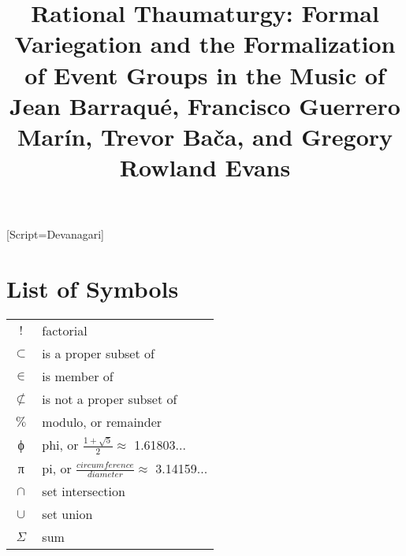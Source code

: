 \documentclass[
    School=Harvard,
    twoside,
    openright,
    BCOR10mm,
]{Dissertate}%
\begin{document}
\newfontfamily{}[Script=Devanagari]

\maketitle
\copyrightpage
\justifying
\dedicationpage
\frontispiece
\acknowledgments
\title{Rational Thaumaturgy: Formal Variegation and the Formalization of Event Groups in the Music of Jean Barraqué, Francisco Guerrero Marín, Trevor Bača, and Gregory Rowland Evans} %
\scholarlyabstractpage
\publicabstractpage
\tableofcontents
\cleardoublepage
{}
{}
\listoftables
\cleardoublepage
{}
{}
\listoffigures
\cleardoublepage
{}
{}
\lstlistoflistings
{}
\chapter*{List of Symbols}
\begin{tabular}{cp{}}
    $!$ & factorial \\
    $\subset$ & is a proper subset of \\
    $\in$ & is member of \\
    $\not\subset$ & is not a proper subset of \\
    $\%$ & modulo, or remainder \\
    ϕ & phi, or $\frac{1 + \sqrt{5}}{2}\approx$ 1.61803...\\
    π & pi, or $\frac{circumference}{diameter}\approx$ 3.14159... \\
    $\cap$ & set intersection \\
    $\cup$ & set union \\
    $\Sigma$ & sum \\
\end{tabular}\\


{}
\end{document}
